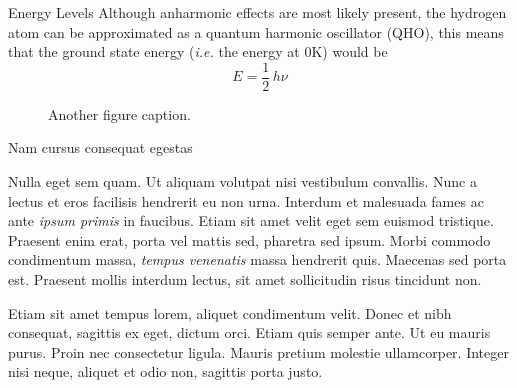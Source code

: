 \documentclass[final]{beamer}
\newlength{\colwidth}
\begin{document}
\begin{frame}[t]
\begin{columns}[t]
\begin{column}{\colwidth}
\begin{block}{Energy Levels}
    Although anharmonic effects are most likely present, the hydrogen atom can be approximated as a quantum harmonic oscillator (QHO), this means that the ground state energy (\emph{i.e.} the energy at 0K) would be 
    $$E = \frac{1}{2}\,h\nu$$

    \begin{figure}
      \centering
      \caption{Another figure caption.}
    \end{figure}

  \end{block}

  \begin{block}{Nam cursus consequat egestas}

    Nulla eget sem quam. Ut aliquam volutpat nisi vestibulum convallis. Nunc a
    lectus et eros facilisis hendrerit eu non urna. Interdum et malesuada fames
    ac ante \textit{ipsum primis} in faucibus. Etiam sit amet velit eget sem
    euismod tristique. Praesent enim erat, porta vel mattis sed, pharetra sed
    ipsum. Morbi commodo condimentum massa, \textit{tempus venenatis} massa
    hendrerit quis. Maecenas sed porta est. Praesent mollis interdum lectus,
    sit amet sollicitudin risus tincidunt non.

    Etiam sit amet tempus lorem, aliquet condimentum velit. Donec et nibh
    consequat, sagittis ex eget, dictum orci. Etiam quis semper ante. Ut eu
    mauris purus. Proin nec consectetur ligula. Mauris pretium molestie
    ullamcorper. Integer nisi neque, aliquet et odio non, sagittis porta justo.


\end{block}
\end{column}
\end{columns}
\end{frame}
\end{document}
